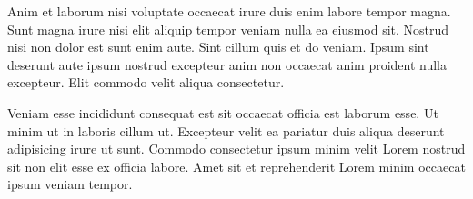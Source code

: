 \begin{multicols}{2}
Anim et laborum nisi voluptate occaecat irure duis enim labore tempor magna. Sunt magna irure nisi elit aliquip tempor veniam nulla ea eiusmod sit. Nostrud nisi non dolor est sunt enim aute. Sint cillum quis et do veniam. Ipsum sint deserunt aute ipsum nostrud excepteur anim non occaecat anim proident nulla excepteur. Elit commodo velit aliqua consectetur.


Veniam esse incididunt consequat est sit occaecat officia est laborum esse. Ut minim ut in laboris cillum ut. Excepteur velit ea pariatur duis aliqua deserunt adipisicing irure ut sunt. Commodo consectetur ipsum minim velit Lorem nostrud sit non elit esse ex officia labore. Amet sit et reprehenderit Lorem minim occaecat ipsum veniam tempor.




\end{multicols}





